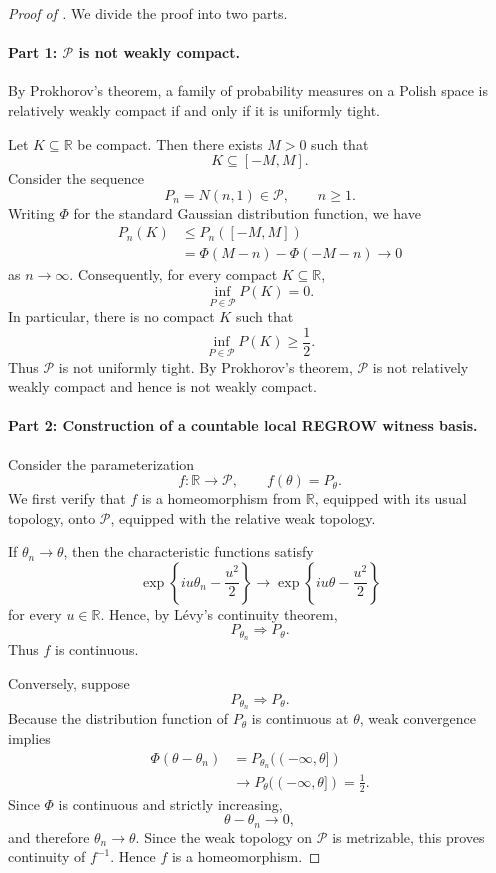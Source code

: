 \documentclass[10pt,a4paper]{amsart}
\begin{document}
\begin{proof}[Proof of ]
We divide the proof into two parts.
\paragraph{Part 1: $\mathcal P$ is not weakly compact.}

By Prokhorov's theorem, a family of probability measures on a
Polish space is relatively weakly compact if and only if it is
uniformly tight.

Let $K\subseteq\mathbb R$ be compact. Then there exists $M>0$
such that
\[
    K\subseteq[-M,M].
\]
Consider the sequence
\[
    P_n=N(n,1)\in\mathcal P,
    \qquad n\ge1.
\]
Writing $\Phi$ for the standard Gaussian distribution function,
we have
\[
\begin{aligned}
    P_n(K)
    &\le
    P_n([-M,M])\\
    &=
    \Phi(M-n)-\Phi(-M-n)
    \longrightarrow0
\end{aligned}
\]
as $n\to\infty$. Consequently, for every compact
$K\subseteq\mathbb R$,
\[
    \inf_{P\in\mathcal P}P(K)=0.
\]
In particular, there is no compact $K$ such that
\[
    \inf_{P\in\mathcal P}P(K)\ge\frac12.
\]
Thus $\mathcal P$ is not uniformly tight. By Prokhorov's
theorem, $\mathcal P$ is not relatively weakly compact and hence
is not weakly compact.

\paragraph{Part 2: Construction of a countable local
REGROW witness basis.}

Consider the parameterization
\[
    f:\mathbb R\longrightarrow\mathcal P,
    \qquad
    f(\theta)=P_\theta.
\]
We first verify that $f$ is a homeomorphism from $\mathbb R$,
equipped with its usual topology, onto $\mathcal P$, equipped
with the relative weak topology.

If $\theta_n\to\theta$, then the characteristic functions satisfy
\[
    \exp\left\{
        i u\theta_n-\frac{u^2}{2}
    \right\}
    \longrightarrow
    \exp\left\{
        i u\theta-\frac{u^2}{2}
    \right\}
\]
for every $u\in\mathbb R$. Hence, by L\'evy's continuity theorem,
\[
    P_{\theta_n}\Rightarrow P_\theta.
\]
Thus $f$ is continuous.

Conversely, suppose
\[
    P_{\theta_n}\Rightarrow P_\theta.
\]
Because the distribution function of $P_\theta$ is continuous
at $\theta$, weak convergence implies
\[
\begin{aligned}
    \Phi(\theta-\theta_n)
    &=
    P_{\theta_n}((-\infty,\theta])\\
    &\longrightarrow
    P_\theta((-\infty,\theta])
    =
    \frac12.
\end{aligned}
\]
Since $\Phi$ is continuous and strictly increasing,
\[
    \theta-\theta_n\longrightarrow0,
\]
and therefore $\theta_n\to\theta$. Since the weak topology on
$\mathcal P$ is metrizable, this proves continuity of $f^{-1}$.
Hence $f$ is a homeomorphism.


\end{proof}
\end{document}
